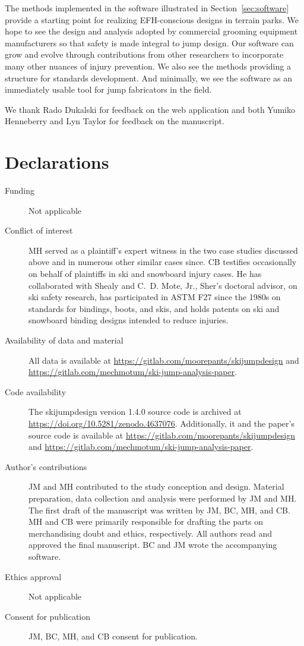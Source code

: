 \documentclass[smallextended]{svjour3}       %
\begin{document}
The methods implemented in the software illustrated in
Section~\ref{sec:software} provide a starting point for realizing EFH-conscious
designs in terrain parks. We hope to see the design and analysis adopted by
commercial grooming equipment manufacturers so that safety is made integral to
jump design. Our software can grow and evolve through contributions from other
researchers to incorporate many other nuances of injury prevention. We also see
the methods providing a structure for standards development. And minimally, we
see the software as an immediately usable tool for jump fabricators in the
field.

\begin{acknowledgements}
  We thank Rado Dukalski for feedback on the web application and both Yumiko
  Henneberry and Lyn Taylor for feedback on the manuscript.
\end{acknowledgements}

\section*{Declarations}
\begin{description}
  \item[Funding] Not applicable
  \item[Conflict of interest] MH served as a plaintiff's expert witness in the
    two case studies discussed above and in numerous other similar cases since.
    CB testifies occasionally on behalf of plaintiffs in ski and snowboard
    injury cases. He has collaborated with Shealy and C.~D. Mote, Jr., Sher's
    doctoral advisor, on ski safety research, has participated in ASTM F27
    since the 1980s on standards for bindings, boots, and skis, and holds
    patents on ski and snowboard binding designs intended to reduce injuries.
  \item[Availability of data and material] All data is available at
    \url{https://gitlab.com/moorepants/skijumpdesign} and
    \url{https://gitlab.com/mechmotum/ski-jump-analysis-paper}.
  \item[Code availability] The skijumpdesign version 1.4.0 source code is
    archived at \url{https://doi.org/10.5281/zenodo.4637076}. Additionally, it
    and the paper's source code is available at
    \url{https://gitlab.com/moorepants/skijumpdesign} and
    \url{https://gitlab.com/mechmotum/ski-jump-analysis-paper}.
  \item[Author's contributions] JM and MH contributed to the study conception
    and design. Material preparation, data collection and analysis were
    performed by JM and MH. The first draft of the manuscript was written by
    JM, BC, MH, and CB. MH and CB were primarily responsible for drafting
    the parts on merchandising doubt and ethics, respectively. All authors read
    and approved the final manuscript. BC and JM wrote the accompanying
    software.
  \item[Ethics approval] Not applicable
  \item[Consent for publication] JM, BC, MH, and CB consent for publication.
\end{description}
\end{document}
